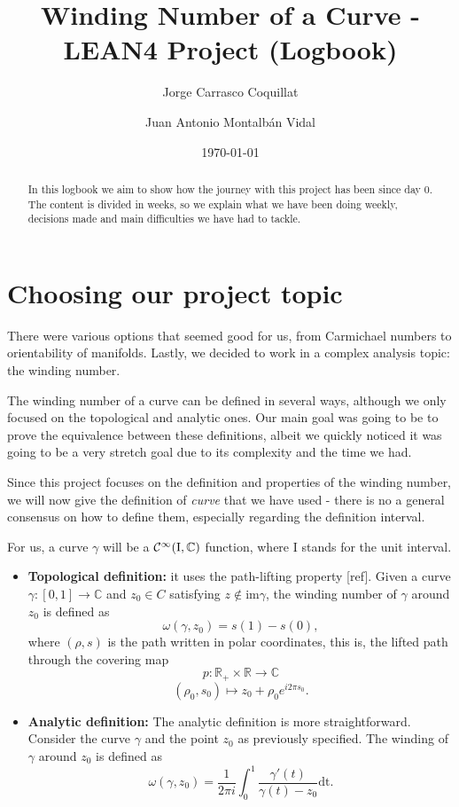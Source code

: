 \documentclass[a4paper,12pt]{article}
\title{Winding Number of a Curve - LEAN4 Project (Logbook)}
\author{Jorge Carrasco Coquillat \and
Juan Antonio Montalbán Vidal}
\date{\today} %
\begin{document}
\maketitle

\begin{abstract}
In this logbook we aim to show how the journey with this project has been since day 0.
The content is divided in weeks, so we explain what we have been doing weekly,
decisions made and main difficulties we have had to tackle.
\end{abstract}

\section{Choosing our project topic}
There were various options that seemed good for us, from Carmichael numbers
to orientability of manifolds. Lastly, we decided to work in a complex analysis topic:
the winding number.

The winding number of a curve can be defined in several ways, although we only
focused on the topological and analytic ones. Our main goal was going to be
to prove the equivalence between these definitions, albeit we quickly noticed
it was going to be a very stretch goal due to its complexity and the time we had.

Since this project focuses on the definition and properties of the winding number,
we will now give the definition of \textit{curve} that we have used - there is no a general
consensus on how to define them, especially regarding the definition interval.

For us, a curve $\gamma$ will be a $\cal{C}^1 (\text{I}, \mathbb{C})$ function, where I stands for the unit interval.

\begin{itemize}
  \item \textbf{Topological definition:} it uses the path-lifting property [ref]. Given
  a curve $\gamma : [0, 1] \to \mathbb{C}$ and $z_0 \in C$ satisfying $z \notin \text{im} \gamma$, the winding
  number of $\gamma$ around $z_0$ is defined as
  $$\omega (\gamma, z_0) = s(1) - s(0),$$
  where $(\rho, s)$ is the path written in polar coordinates, this is, the lifted path
  through the covering map
  $$p : \mathbb{R}_+ \times \mathbb{R} \to \mathbb{C}$$
  $$(\rho_0, s_0) \mapsto z_0 + \rho_0 e^{i2\pi s_0}.$$
  \item \textbf{Analytic definition:} The analytic definition is more straightforward. Consider the curve $\gamma$
  and the point $z_0$ as previously specified. The winding of $\gamma$ around $z_0$ is defined as
  $$\omega(\gamma, z_0) = \frac{1}{2\pi i} \int_{0}^{1} {\frac{\gamma'(t)}{\gamma(t)-z_0} \text{dt}}.$$
\end{itemize}
\end{document}
